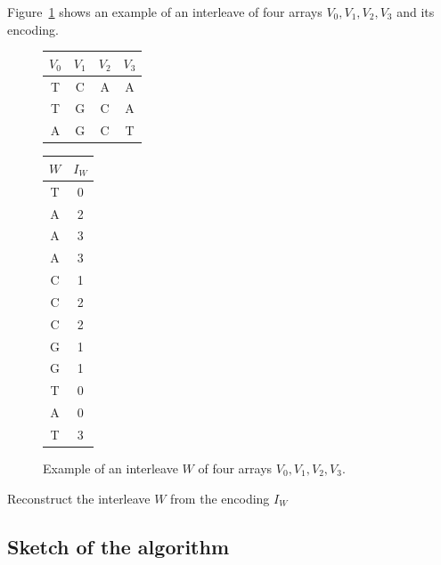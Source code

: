 \documentclass[a4paper,12pt, oneside]{article}
\begin{document}
Figure~\ref{fig:interleave} shows an example of an interleave of four arrays $V_0, V_1, V_2, V_3$ and its encoding.

\begin{figure}[htbp]
  \centering
    \begin{minipage}{0.3\textwidth}%
  \begin{tabular}{|c|c|c|c|}
\hline
$V_{0}$&$V_{1}$&$V_{2}$&$V_{3}$\\\hline
T&C&A&A\\
T&G&C&A\\
A&G&C&T\\
\hline
\end{tabular}
  \end{minipage}%
  \quad%
    \begin{minipage}{0.3\textwidth}%
  \begin{tabular}{|c|c|}
    \hline
    $W$&$I_{W}$\\\hline
    T&0\\
    A&2\\
    A&3\\
    A&3\\
    C&1\\
    C&2\\
    C&2\\
    G&1\\
    G&1\\
    T&0\\
    A&0\\
    T&3\\
\hline
\end{tabular}
\end{minipage}
\caption{Example of an interleave $W$ of four arrays $V_0, V_1, V_2, V_3$.}
	\label{fig:interleave} 
\end{figure}
 
\begin{algorithm}[htb!]

	
	\caption{Reconstruct the interleave $W$ from the encoding $I_W$}
	\label{alg:interleave-encoding}
\end{algorithm}
\newpage

\subsection{Sketch of the algorithm}
\end{document}
